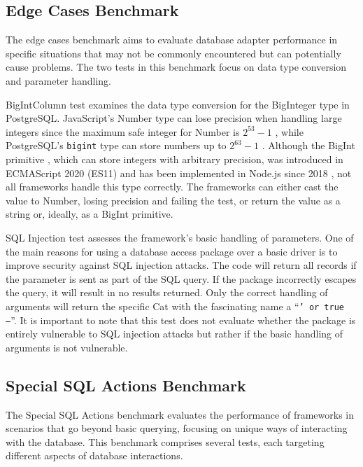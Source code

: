 \subsection{Edge Cases Benchmark}

The edge cases benchmark aims to evaluate database adapter performance in
specific situations that may not be commonly encountered but can potentially
cause problems. The two tests in this benchmark focus on data type conversion
and parameter handling.

BigIntColumn test examines the data type conversion for the BigInteger type in
PostgreSQL. JavaScript's Number type can lose precision when handling large
integers since the maximum safe integer for Number is \(2^{53} - 1\)
\cite{MDNNumber}, while PostgreSQL's \texttt{bigint} type can store numbers up
to \(2^{63} - 1\) \cite{PostgresNumeric}. Although the BigInt primitive
\cite{MDNBigInt}, which can store integers with arbitrary precision, was
introduced in ECMAScript 2020 (ES11) \cite{ecma-262} and has been implemented in
Node.js since 2018 \cite{MDNBigInt}, not all frameworks handle this type
correctly. The frameworks can either cast the value to Number, losing precision
and failing the test, or return the value as a string or, ideally, as a BigInt
primitive.

SQL Injection test assesses the framework's basic handling of parameters. One of
the main reasons for using a database access package over a basic driver is to
improve security against SQL injection attacks. The code will return all records
if the parameter is sent as part of the SQL query. If the package incorrectly
escapes the query, it will result in no results returned. Only the correct
handling of arguments will return the specific Cat with the fascinating name a
\enquote{\texttt{' or true --}}. It is important to note that this test does not
evaluate whether the package is entirely vulnerable to SQL injection attacks but
rather if the basic handling of arguments is not vulnerable.

\subsection{Special SQL Actions Benchmark}

The Special SQL Actions benchmark evaluates the performance of frameworks in
scenarios that go beyond basic querying, focusing on unique ways of interacting
with the database. This benchmark comprises several tests, each targeting
different aspects of database interactions.

